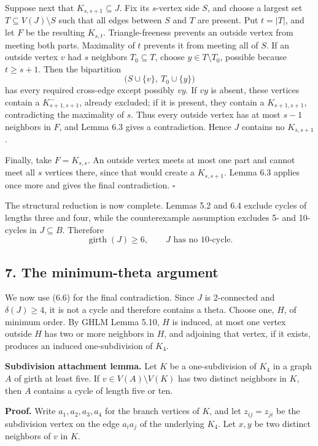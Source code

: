 \documentclass[
  11pt]{article}
\let\papersection\subsection
\renewcommand{\subsection}{\Needspace{10\baselineskip}\papersection}
\begin{document}
Suppose next that \(K_{s,s+1}\subseteq J\). Fix its \(s\)-vertex side
\(S\), and choose a largest set \(T\subseteq V(J)\setminus S\) such that
all edges between \(S\) and \(T\) are present. Put \(t=|T|\), and let
\(F\) be the resulting \(K_{s,t}\). Triangle-freeness prevents an
outside vertex from meeting both parts. Maximality of \(t\) prevents it
from meeting all of \(S\). If an outside vertex \(v\) had \(s\)
neighbors \(T_0\subseteq T\), choose \(y\in T\setminus T_0\), possible
because \(t\ge s+1\). Then the bipartition \[
 \bigl(S\cup\{v\},\ T_0\cup\{y\}\bigr)
\] has every required cross-edge except possibly \(vy\). If \(vy\) is
absent, these vertices contain a \(K_{s+1,s+1}^-\), already excluded; if
it is present, they contain a \(K_{s+1,s+1}\), contradicting the
maximality of \(s\). Thus every outside vertex has at most \(s-1\)
neighbors in \(F\), and Lemma 6.3 gives a contradiction. Hence \(J\)
contains no \(K_{s,s+1}\).

Finally, take \(F=K_{s,s}\). An outside vertex meets at most one part
and cannot meet all \(s\) vertices there, since that would create a
\(K_{s,s+1}\). Lemma 6.3 applies once more and gives the final
contradiction. \(\square\)

The structural reduction is now complete. Lemmas 5.2 and 6.4 exclude
cycles of lengths three and four, while the counterexample assumption
excludes 5- and 10-cycles in \(J\subseteq B\). Therefore \[
 \operatorname{girth}(J)\ge6,
 \qquad
 J\text{ has no 10-cycle}. \tag{6.6}
\]

\subsection{7. The minimum-theta
argument}\label{the-minimum-theta-argument}

We now use (6.6) for the final contradiction. Since \(J\) is 2-connected
and \(\delta(J)\ge4\), it is not a cycle and therefore contains a theta.
Choose one, \(H\), of minimum order. By GHLM Lemma 5.10, \(H\) is
induced, at most one vertex outside \(H\) has two or more neighbors in
\(H\), and adjoining that vertex, if it exists, produces an induced
one-subdivision of \(K_4\).

\textbf{Subdivision attachment lemma.} Let \(K\) be a one-subdivision of
\(K_4\) in a graph \(A\) of girth at least five. If
\(v\in V(A)\setminus V(K)\) has two distinct neighbors in \(K\), then
\(A\) contains a cycle of length five or ten.

\textbf{Proof.} Write \(a_1,a_2,a_3,a_4\) for the branch vertices of
\(K\), and let \(z_{ij}=z_{ji}\) be the subdivision vertex on the edge
\(a_ia_j\) of the underlying \(K_4\). Let \(x,y\) be two distinct
neighbors of \(v\) in \(K\).
\end{document}
